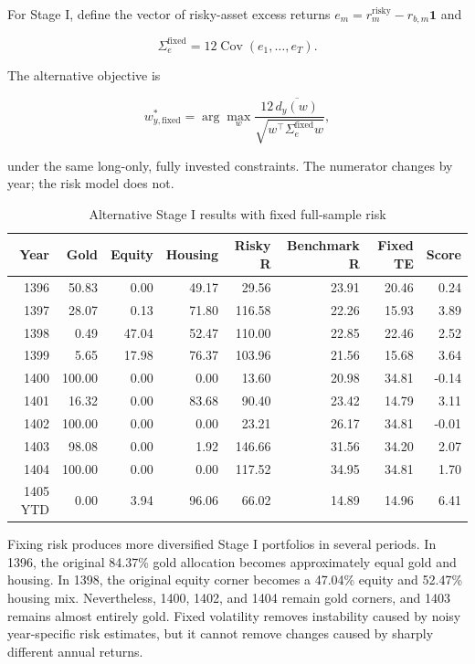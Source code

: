 \documentclass[11pt,a4paper]{article}
\newcommand{\Cov}{\operatorname{Cov}}
\begin{document}
For Stage I, define the vector of risky-asset excess returns
$e_m=r_m^{\text{risky}}-r_{b,m}\mathbf{1}$ and

\begin{equation}
\Sigma_{e}^{\text{fixed}}=12\Cov(e_1,\ldots,e_T).
\end{equation}

The alternative objective is

\begin{equation}
w_{y,\text{fixed}}^*=\arg\max_w
\frac{12\,\overline{d_y(w)}}
{\sqrt{w^\top\Sigma_e^{\text{fixed}}w}},
\end{equation}

under the same long-only, fully invested constraints. The numerator changes by year; the risk
model does not.

\begin{landscape}
\begin{table}[p]
\centering
\small
\caption{Alternative Stage I results with fixed full-sample risk}
\begin{tabular}{rrrrrrrr}
\toprule
Year & Gold & Equity & Housing & Risky R & Benchmark R & Fixed TE & Score \\
\midrule
1396 & 50.83&0.00&49.17&29.56&23.91&20.46&0.24\\
1397 & 28.07&0.13&71.80&116.58&22.26&15.93&3.89\\
1398 & 0.49&47.04&52.47&110.00&22.85&22.46&2.52\\
1399 & 5.65&17.98&76.37&103.96&21.56&15.68&3.64\\
1400 & 100.00&0.00&0.00&13.60&20.98&34.81&-0.14\\
1401 & 16.32&0.00&83.68&90.40&23.42&14.79&3.11\\
1402 & 100.00&0.00&0.00&23.21&26.17&34.81&-0.01\\
1403 & 98.08&0.00&1.92&146.66&31.56&34.20&2.07\\
1404 & 100.00&0.00&0.00&117.52&34.95&34.81&1.70\\
1405 YTD & 0.00&3.94&96.06&66.02&14.89&14.96&6.41\\
\bottomrule
\end{tabular}
\end{table}
\end{landscape}

Fixing risk produces more diversified Stage I portfolios in several periods. In 1396, the
original 84.37\% gold allocation becomes approximately equal gold and housing. In 1398, the
original equity corner becomes a 47.04\% equity and 52.47\% housing mix. Nevertheless, 1400,
1402, and 1404 remain gold corners, and 1403 remains almost entirely gold. Fixed volatility
removes instability caused by noisy year-specific risk estimates, but it cannot remove changes
caused by sharply different annual returns.
\end{document}
